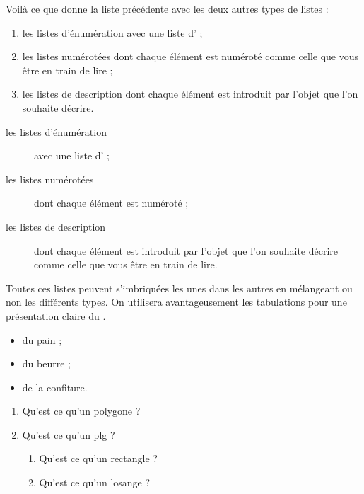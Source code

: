 \documentclass[10pt,french]{book}
\begin{document}
Voilà ce que donne la liste précédente avec les deux autres types de listes :

\begin{enumerate}[font=\mdseries,label=\arabic*.]
    \item les listes d'énumération avec une liste d' ;
    \item les listes numérotées dont chaque élément est numéroté comme celle que vous être en train de lire ;
    \item les listes de description dont chaque élément est introduit par l'objet que l'on souhaite décrire.
\end{enumerate}

\begin{description}
    \item[les listes d'énumération] avec une liste d' ;
    \item[les listes numérotées] dont chaque élément est numéroté ;
    \item[les listes de description] dont chaque élément est introduit par l'objet que l'on souhaite décrire comme celle que vous être en train de lire.
\end{description}

Toutes ces listes peuvent s'imbriquées les unes dans les autres en mélangeant ou non les différents types. On utilisera avantageusement les tabulations pour une présentation claire du .\bigskip

{\NewFont\reset
\begin{SideBySideExample}
    \begin{itemize}
        \item du pain ;
        \item du beurre ;
        \item de la confiture.
    \end{itemize}
\end{SideBySideExample}
\bigskip}

{\NewFont\reset
\begin{SideBySideExample}
    \begin{enumerate}
        \item Qu'est ce qu'un polygone ?
        \item Qu'est ce qu'un plg ?
            \begin{enumerate}
                \item Qu'est ce qu'un rectangle ?
                \item Qu'est ce qu'un losange ?
            \end{enumerate}
    \end{enumerate}
\end{SideBySideExample}
\bigskip}
\end{document}
